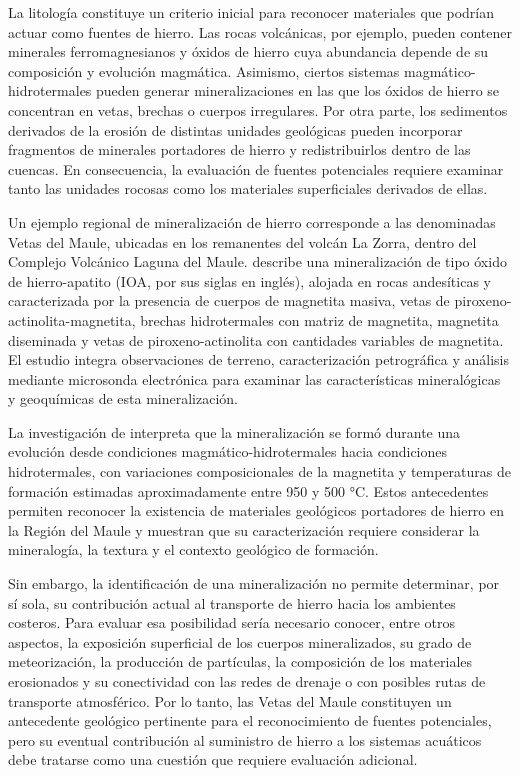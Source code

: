 La litología constituye un criterio inicial para reconocer materiales que podrían actuar como fuentes de hierro. Las rocas volcánicas, por ejemplo, pueden contener minerales ferromagnesianos y óxidos de hierro cuya abundancia depende de su composición y evolución magmática. Asimismo, ciertos sistemas magmático-hidrotermales pueden generar mineralizaciones en las que los óxidos de hierro se concentran en vetas, brechas o cuerpos irregulares. Por otra parte, los sedimentos derivados de la erosión de distintas unidades geológicas pueden incorporar fragmentos de minerales portadores de hierro y redistribuirlos dentro de las cuencas. En consecuencia, la evaluación de fuentes potenciales requiere examinar tanto las unidades rocosas como los materiales superficiales derivados de ellas.

Un ejemplo regional de mineralización de hierro corresponde a las denominadas Vetas del Maule, ubicadas en los remanentes del volcán La Zorra, dentro del Complejo Volcánico Laguna del Maule. \cite{Cofre2022} describe una mineralización de tipo óxido de hierro-apatito (IOA, por sus siglas en inglés), alojada en rocas andesíticas y caracterizada por la presencia de cuerpos de magnetita masiva, vetas de piroxeno-actinolita-magnetita, brechas hidrotermales con matriz de magnetita, magnetita diseminada y vetas de piroxeno-actinolita con cantidades variables de magnetita. El estudio integra observaciones de terreno, caracterización petrográfica y análisis mediante microsonda electrónica para examinar las características mineralógicas y geoquímicas de esta mineralización.

La investigación de \cite{Cofre2022} interpreta que la mineralización se formó durante una evolución desde condiciones magmático-hidrotermales hacia condiciones hidrotermales, con variaciones composicionales de la magnetita y temperaturas de formación estimadas aproximadamente entre 950 y 500 °C. Estos antecedentes permiten reconocer la existencia de materiales geológicos portadores de hierro en la Región del Maule y muestran que su caracterización requiere considerar la mineralogía, la textura y el contexto geológico de formación.

Sin embargo, la identificación de una mineralización no permite determinar, por sí sola, su contribución actual al transporte de hierro hacia los ambientes costeros. Para evaluar esa posibilidad sería necesario conocer, entre otros aspectos, la exposición superficial de los cuerpos mineralizados, su grado de meteorización, la producción de partículas, la composición de los materiales erosionados y su conectividad con las redes de drenaje o con posibles rutas de transporte atmosférico. Por lo tanto, las Vetas del Maule constituyen un antecedente geológico pertinente para el reconocimiento de fuentes potenciales, pero su eventual contribución al suministro de hierro a los sistemas acuáticos debe tratarse como una cuestión que requiere evaluación adicional.


